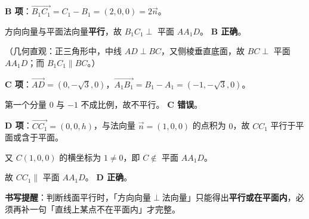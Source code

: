 \begin{answer}
\textbf{B 项}：$\overrightarrow{B_1C_1}=C_1-B_1=(2,0,0)=2\vec n$。

方向向量与平面法向量\textbf{平行}，故 $B_1C_1\perp$ 平面 $AA_1D$。 \textbf{B 正确}。

（几何直观：正三角形中，中线 $AD\perp BC$，又侧棱垂直底面，故 $BC\perp$ 平面 $AA_1D$；而 $B_1C_1\parallel BC$。）

\textbf{C 项}：$\overrightarrow{AD}=\left(0,-\sqrt3,0\right)$，$\overrightarrow{A_1B_1}=B_1-A_1=\left(-1,-\sqrt3,0\right)$。

第一个分量 $0$ 与 $-1$ 不成比例，故不平行。 \textbf{C 错误}。

\textbf{D 项}：$\overrightarrow{CC_1}=(0,0,h)$，与法向量 $\vec n=(1,0,0)$ 的点积为 $0$，故 $CC_1$ 平行于平面或含于平面。

又 $C(1,0,0)$ 的横坐标为 $1\ne0$，即 $C\notin$ 平面 $AA_1D$。

故 $CC_1\parallel$ 平面 $AA_1D$。 \textbf{D 正确}。

\begin{gktip}
\textbf{书写提醒}：判断线面平行时，「方向向量$\perp$法向量」只能得出\textbf{平行或在平面内}，必须再补一句「直线上某点不在平面内」才完整。
\end{gktip}


\par\medskip

\end{answer}
